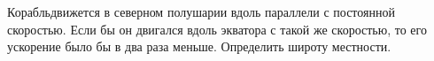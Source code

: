 Корабльдвижется в северном полушарии вдоль параллели с постоянной 
скоростью. Если бы он двигался вдоль экватора с такой же скоростью, то 
его ускорение было бы в два раза меньше. Определить широту местности.
